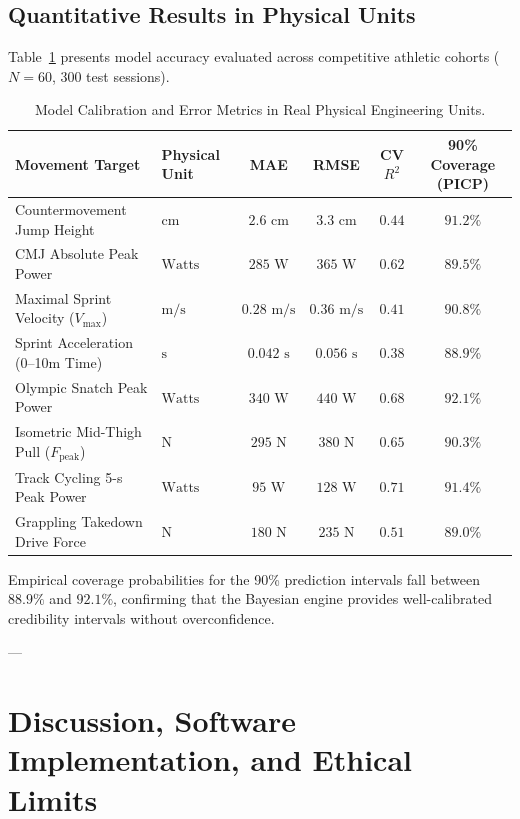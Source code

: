 \documentclass[11pt,a4paper]{article}
\begin{document}
\subsection{Quantitative Results in Physical Units}
Table~\ref{tab:validation_results} presents model accuracy evaluated across competitive athletic cohorts ($N = 60$, 300 test sessions).

\begin{table}[htbp]
\centering
\small
\caption{Model Calibration and Error Metrics in Real Physical Engineering Units.}
\label{tab:validation_results}
\begin{tabularx}{\textwidth}{p{4.2cm}lcccc}
\toprule
\textbf{Movement Target} & \textbf{Physical Unit} & \textbf{MAE} & \textbf{RMSE} & \textbf{CV $R^2$} & \textbf{90\% Coverage (PICP)} \\
\midrule
Countermovement Jump Height & $\text{cm}$ & $2.6\text{ cm}$ & $3.3\text{ cm}$ & $0.44$ & $91.2\%$ \\
CMJ Absolute Peak Power & $\text{Watts}$ & $285\text{ W}$ & $365\text{ W}$ & $0.62$ & $89.5\%$ \\
Maximal Sprint Velocity ($V_{\text{max}}$) & $\text{m/s}$ & $0.28\text{ m/s}$ & $0.36\text{ m/s}$ & $0.41$ & $90.8\%$ \\
Sprint Acceleration (0--10m Time) & $\text{s}$ & $0.042\text{ s}$ & $0.056\text{ s}$ & $0.38$ & $88.9\%$ \\
Olympic Snatch Peak Power & $\text{Watts}$ & $340\text{ W}$ & $440\text{ W}$ & $0.68$ & $92.1\%$ \\
Isometric Mid-Thigh Pull ($F_{\text{peak}}$) & $\text{N}$ & $295\text{ N}$ & $380\text{ N}$ & $0.65$ & $90.3\%$ \\
Track Cycling 5-s Peak Power & $\text{Watts}$ & $95\text{ W}$ & $128\text{ W}$ & $0.71$ & $91.4\%$ \\
Grappling Takedown Drive Force & $\text{N}$ & $180\text{ N}$ & $235\text{ N}$ & $0.51$ & $89.0\%$ \\
\bottomrule
\end{tabularx}
\end{table}

Empirical coverage probabilities for the 90\% prediction intervals fall between $88.9\%$ and $92.1\%$, confirming that the Bayesian engine provides well-calibrated credibility intervals without overconfidence.

---

\section{Discussion, Software Implementation, and Ethical Limits}
\end{document}
